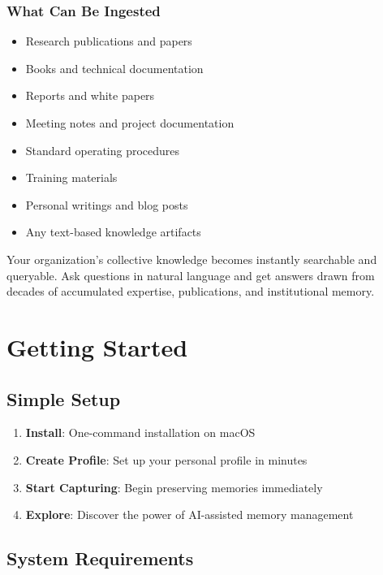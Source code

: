 \documentclass[11pt,letterpaper]{article}
\begin{document}
\subsubsection{What Can Be Ingested}
\begin{itemize}[leftmargin=*]
    \item Research publications and papers
    \item Books and technical documentation
    \item Reports and white papers
    \item Meeting notes and project documentation
    \item Standard operating procedures
    \item Training materials
    \item Personal writings and blog posts
    \item Any text-based knowledge artifacts
\end{itemize}

\begin{tcolorbox}[colback=lightgray,colframe=secondarygreen,title=The Result]
Your organization's collective knowledge becomes instantly searchable and queryable. Ask questions in natural language and get answers drawn from decades of accumulated expertise, publications, and institutional memory.
\end{tcolorbox}

\newpage
\section{Getting Started}

\subsection{Simple Setup}
\begin{enumerate}
    \item \textbf{Install}: One-command installation on macOS
    \item \textbf{Create Profile}: Set up your personal profile in minutes
    \item \textbf{Start Capturing}: Begin preserving memories immediately
    \item \textbf{Explore}: Discover the power of AI-assisted memory management
\end{enumerate}

\subsection{System Requirements}
\end{document}

